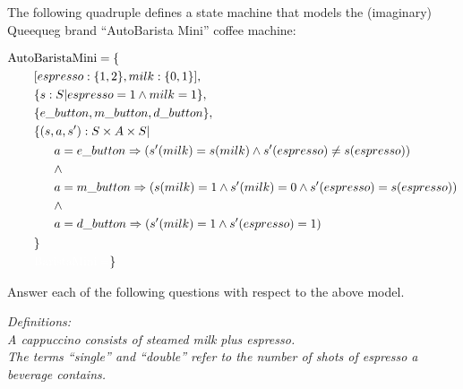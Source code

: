 \documentclass[12pt,fleqn]{article}
\begin{document}
The following quadruple defines a state machine that models the (imaginary) Queequeg brand ``AutoBarista Mini'' coffee machine:

\begin{equation*}\begin{split}
\mathrm{Auto}&\mathrm{BaristaMini} = \{\\
&[ espresso : \{ 1, 2 \}, milk : \{ 0, 1 \} ],\\
&\{ s: S | espresso = 1 \wedge milk = 1 \},\\
&\{ e\_button, m\_button, d\_button\},\\
&\{(s,a,s'): S\times A\times S | \\
&\begin{split}
~~~~~&a = e\_button \Rightarrow (s'(milk)=s(milk) \wedge s'(espresso)\neq s(espresso) )\\
&\wedge\\
&a = m\_button \Rightarrow (s(milk)=1 \wedge s'(milk)=0 \wedge s'(espresso)=s(espresso))\\
&\wedge\\
&a = d\_button \Rightarrow (s'(milk)=1 \wedge s'(espresso)=1)
\end{split}\\
&\}\\
&\color{white}\mathrm{BaristaMini} = \color{black}\}
\end{split}\end{equation*}

Answer each of the following questions with respect to the above model.

\vspace*{2ex}

{\em Definitions:\\[2ex]
A cappuccino consists of steamed milk plus espresso.\\[1ex]
The terms ``single'' and ``double'' refer to the number of shots of espresso a beverage contains.}

\clearpage
\end{document}

